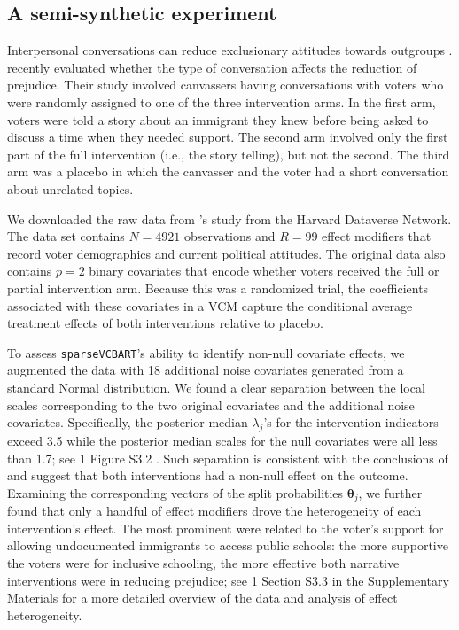 \documentclass[11pt]{article}
\newcommand{\btheta}{\boldsymbol{\theta}}
\theoremstyle{plain}
\theoremstyle{definition}
\theoremstyle{plain}
\newcommand{\includesupp}{1}
\newcommand{\switchref}[2]{%
  \if\includesupp1%
    #1%
  \else%
    #2%
  \fi%
}
\begin{document}
\subsection{A semi-synthetic experiment}
\label{sec:semisynth}

Interpersonal conversations can reduce exclusionary attitudes towards outgroups \citep{broockman_kalla16, williamson_etal21}.
\citet{kalla_broockman23} recently evaluated whether the type of conversation affects the reduction of prejudice. 
Their study involved canvassers having conversations with voters who were randomly assigned to one of the three intervention arms.
In the first arm, voters were told a story about an immigrant they knew before being asked to discuss a time when they needed support.
The second arm involved only the first part of the full intervention (i.e., the story telling), but not the second.
The third arm was a placebo in which the canvasser and the voter had a short conversation about unrelated topics.

We downloaded the raw data from \citet{kalla_broockman23}'s study from the Harvard Dataverse Network.
The data set contains $N = 4921$ observations and $R = 99$ effect modifiers that record voter demographics and current political attitudes.
The original data also contains $p = 2$ binary covariates that encode whether voters received the full or partial intervention arm.
Because this was a randomized trial, the coefficients associated with these covariates in a VCM capture the conditional average treatment effects of both interventions relative to placebo.

To assess \texttt{sparseVCBART}'s ability to identify non-null covariate effects, we augmented the data with 18 additional noise covariates generated from a standard Normal distribution.
We found a clear separation between the local scales corresponding to the two original covariates and the additional noise covariates.
Specifically, the posterior median $\lambda_{j}$'s for the intervention indicators exceed 3.5 while the posterior median scales for the null covariates were all less than 1.7; see \switchref{}{Figure S3.2}.
Such separation is consistent with the conclusions of  and suggest that both interventions had a non-null effect on the outcome.
Examining the corresponding vectors of the split probabilities $\btheta_{j}$, we further found that only a handful of effect modifiers drove the heterogeneity of each intervention's effect.
The most prominent were related to the voter's support for allowing undocumented immigrants to access public schools: the more supportive the voters were for inclusive schooling, the more effective both narrative interventions were in reducing prejudice; see \switchref{}{Section S3.3 in the Supplementary Materials} for a more detailed overview of the data and analysis of effect heterogeneity. 
\end{document}

